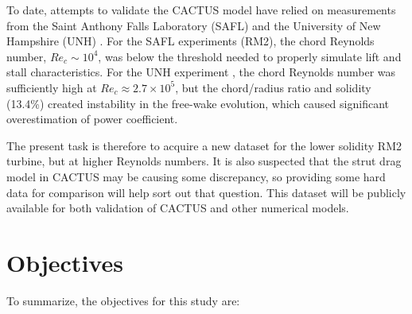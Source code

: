 \documentclass[14pt,letterpaper]{scrreprt}
\begin{document}
To date, attempts to validate the CACTUS model have relied on measurements from
the Saint Anthony Falls Laboratory (SAFL) \cite{Hill2014} and the University of
New Hampshire (UNH) \cite{Neary2013, Michelen2014}. For the SAFL experiments
(RM2), the chord Reynolds number, $Re_c \sim 10^4$, was below the threshold
needed to properly simulate lift and stall characteristics. For the UNH
experiment \cite{Bachant2013}, the chord Reynolds number was sufficiently high
at $Re_c \approx 2.7 \times 10^5$, but the chord/radius ratio and solidity
(13.4\%) created instability in the free-wake evolution, which caused
significant overestimation of power coefficient.

The present task is therefore to acquire a new dataset for the lower solidity
RM2 turbine, but at higher Reynolds numbers. It is also suspected that the strut
drag model in CACTUS may be causing some discrepancy, so providing some hard
data for comparison will help sort out that question. This dataset will be
publicly available for both validation of CACTUS and other numerical models.

\section{Objectives}

To summarize, the objectives for this study are:
\end{document}
